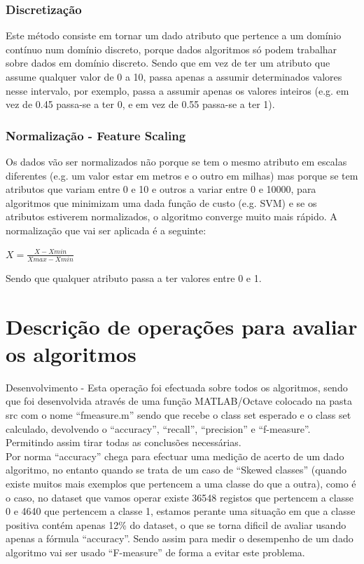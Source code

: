\documentclass[portugues,final]{revdetua}
\begin{document}
\subsubsection{Discretização}

Este método consiste em tornar um dado atributo que pertence a um domínio contínuo num domínio discreto, porque dados algoritmos só podem trabalhar sobre dados em domínio discreto. Sendo que em vez de ter um atributo que assume qualquer valor de 0 a 10, passa apenas a assumir determinados valores nesse intervalo, por exemplo, passa a assumir apenas os valores inteiros (e.g. em vez de 0.45 passa-se a ter 0, e em vez de 0.55 passa-se a ter 1).

\subsubsection{Normalização - Feature Scaling}

Os dados vão ser normalizados não porque se tem o mesmo atributo em escalas diferentes (e.g. um valor estar em metros e o outro em milhas) mas porque se tem atributos que variam entre 0 e 10 e outros a variar entre 0 e 10000, para algoritmos que minimizam uma dada função de custo (e.g. SVM) e se os atributos estiverem normalizados, o algoritmo converge muito mais rápido.
A normalização que vai ser aplicada é a seguinte: 
\begin{center}{${X} = \frac{X - Xmin}{Xmax - Xmin}$}
\end{center}

Sendo que qualquer atributo passa a ter valores entre 0 e 1.

\section{Descrição de operações para avaliar os algoritmos}

Desenvolvimento - Esta operação foi efectuada sobre todos os algoritmos, sendo que foi desenvolvida através de uma função MATLAB/Octave colocado na pasta src com o nome “fmeasure.m” sendo que recebe o class set esperado e o class set calculado, devolvendo o “accuracy”, “recall”, “precision” e “f-measure”. Permitindo assim tirar todas as conclusões necessárias.\\

Por norma “accuracy” chega para efectuar uma medição de acerto de um dado algoritmo, no entanto quando se trata de um caso de “Skewed classes” (quando existe muitos mais exemplos que pertencem a uma classe do que a outra), como é o caso, no dataset que vamos operar existe 36548 registos que pertencem a classe 0 e 4640 que pertencem a classe 1, estamos perante uma situação em que a classe positiva contém apenas 12\% do dataset, o que se torna dificil de avaliar usando apenas a fórmula “accuracy”.
Sendo assim para medir o desempenho de um dado algoritmo vai ser usado “F-measure” de forma a evitar este problema.
\end{document}
